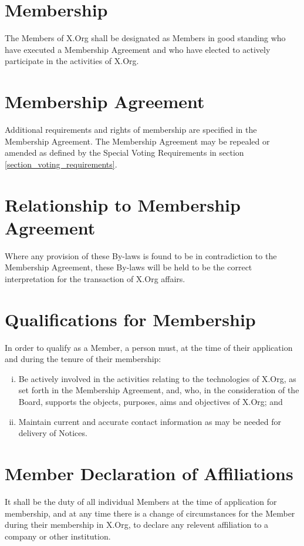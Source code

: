 \documentclass[10pt, english]{bylaws}
\begin{document}

\section{Membership}
The Members of X.Org shall be designated as Members in good standing who have
executed a Membership Agreement and who have elected to actively participate in
the activities of X.Org.

\section{Membership Agreement}
Additional requirements and rights of membership are specified in the Membership
Agreement. The Membership Agreement may be repealed or amended as defined by
the Special Voting Requirements in section \ref{section_voting_requirements}.

\section{Relationship to Membership Agreement}
Where any provision of these By-laws is found to be in contradiction to the
Membership Agreement, these By-laws will be held to be the correct
interpretation for the transaction of X.Org affairs.

\section{Qualifications for Membership}
In order to qualify as a Member, a person must, at the time of their application
and during the tenure of their membership:

\begin{enumerate}[(i)\hspace{.2cm}]
	\item Be actively involved in the activities relating to the
	technologies of X.Org, as set forth in the Membership Agreement, and,
	who, in the consideration of the Board, supports the objects, purposes,
	aims and objectives of X.Org; and

	\item Maintain current and accurate contact information as may be needed
	for delivery of Notices.
\end{enumerate}

\section{Member Declaration of Affiliations}
It shall be the duty of all individual Members at the time of application for
membership, and at any time there is a change of circumstances for the Member
during their membership in X.Org, to declare any relevent affiliation to a
company or other institution.
\end{document}
